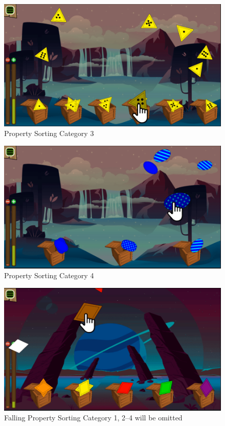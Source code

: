 \begin{figure}[H]
    \centering
    \includegraphics[width=1\textwidth]{figures/property3}
    \caption{Property Sorting Category 3}
    \label{fig:property3}
\end{figure}

\begin{figure}[H]
    \centering
    \includegraphics[width=1\textwidth]{figures/property4}
    \caption{Property Sorting Category 4}
    \label{fig:property4}
\end{figure}

\begin{figure}[H]
    \centering
    \includegraphics[width=1\textwidth]{figures/falling}
    \caption{Falling Property Sorting Category 1, 2--4 will be omitted}
    \label{fig:falling}
\end{figure}

